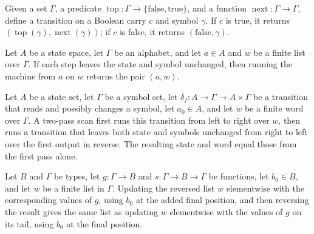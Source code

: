 \begin{definition}
\label{Turing.scanCarry}
\leanok
Given a set $\Gamma$, a predicate
$\operatorname{top}:\Gamma\to\{\mathrm{false},\mathrm{true}\}$, and a function
$\operatorname{next}:\Gamma\to\Gamma$, define a transition on a Boolean carry $c$ and
symbol $\gamma$. If $c$ is true, it returns
$(\operatorname{top}(\gamma),\operatorname{next}(\gamma))$; if $c$ is false, it returns
$(\mathrm{false},\gamma)$.
\end{definition}

\begin{theorem}
\label{Turing.mealyRun_keep}
\leanok
{}
Let $A$ be a state space, let $\Gamma$ be an alphabet, and let $a\in A$ and $w$ be a
finite list over $\Gamma$. If each step leaves the state and symbol unchanged, then
running the machine from $a$ on $w$ returns the pair $(a,w)$.
\end{theorem}

\begin{theorem}
\label{Turing.scanResult_keep}
\leanok
{}
Let $A$ be a state set, let $\Gamma$ be a symbol set, let $\delta_f:A\to\Gamma\to
A\times\Gamma$ be a transition that reads and possibly changes a symbol, let $a_0\in A$,
and let $w$ be a finite word over $\Gamma$. A two-pass scan first runs this transition
from left to right over $w$, then runs a transition that leaves both state and symbols
unchanged from right to left over the first output in reverse. The resulting state and
word equal those from the first pass alone.
\end{theorem}

\begin{theorem}
\label{Turing.shiftLeft_list}
\leanok
{}
Let $B$ and $\Gamma$ be types, let $g:\Gamma\to B$ and $s:\Gamma\to B\to\Gamma$ be
functions, let $b_0\in B$, and let $w$ be a finite list in $\Gamma$. Updating the
reversed list $w$ elementwise with the corresponding values of $g$, using $b_0$ at the
added final position, and then reversing the result gives the same list as updating $w$
elementwise with the values of $g$ on its tail, using $b_0$ at the final position.
\end{theorem}

